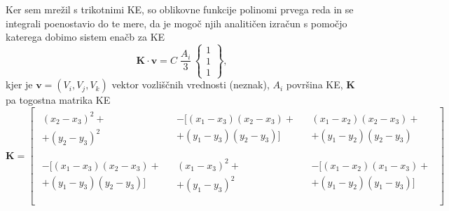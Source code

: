 Ker sem mrežil s trikotnimi KE, so oblikovne funkcije polinomi prvega reda in se integrali poenostavio do te mere, da je mogoč njih analitičen izračun s pomočjo katerega dobimo sistem enačb za KE
\begin{equation}\label{eqn:KE}
    \mathbf{K}\cdot\mathbf{v}= C\;\frac{A_i}{3}\,
    \begin{Bmatrix}
        1\\ 1\\ 1
    \end{Bmatrix},
\end{equation}
kjer je $\mathbf{v}=(V_i,V_j,V_k)$ vektor vozliščnih vrednosti (neznak), $A_i$ površina KE, $\mathbf{K}$ pa togostna matrika KE
\begin{equation}
    \mathbf{K} = \begin{bmatrix}
            \begin{aligned}
                (x_2 - x_3)^2 +\\ + (y_2 - y_3)^2
            \end{aligned} &
            \begin{aligned}
                - [(x_1 - x_3)(x_2 - x_3) +\\+ (y_1 - y_3)(y_2 - y_3)]
            \end{aligned} &
            \begin{aligned}
                (x_1 - x_2)(x_2 - x_3) +\\+ (y_1 - y_2)(y_2 - y_3)
            \end{aligned} \\ \\

            \begin{aligned}
                - [(x_1 - x_3)(x_2 - x_3) +\\+ (y_1 - y_3)(y_2 - y_3)]
            \end{aligned} &
            \begin{aligned}
                (x_1 - x_3)^2 +\\+ (y_1 - y_3)^2
            \end{aligned} &
            \begin{aligned}
                - [(x_1 - x_2)(x_1 - x_3) +\\+ (y_1 - y_2)(y_1 - y_3)]
            \end{aligned} \\ \\


\end{bmatrix}
\end{equation}
